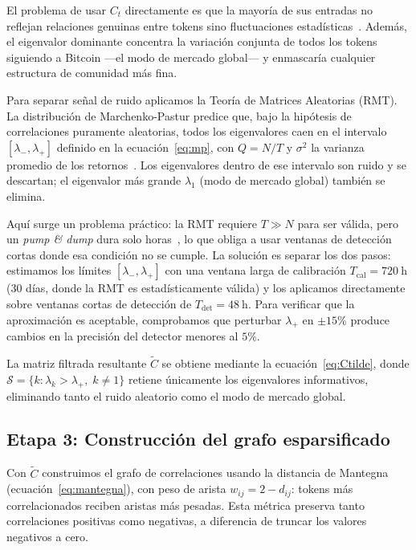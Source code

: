 El problema de usar $C_t$ directamente es que la mayoría de sus entradas
no reflejan relaciones genuinas entre tokens sino fluctuaciones
estadísticas~\cite{plerou1999}. Además, el eigenvalor dominante
concentra la variación conjunta de todos los tokens siguiendo a
Bitcoin ---el modo de mercado global--- y enmascaría cualquier
estructura de comunidad más fina.

Para separar señal de ruido aplicamos la Teoría de Matrices Aleatorias
(RMT). La distribución de Marchenko-Pastur predice que, bajo la hipótesis
de correlaciones puramente aleatorias, todos los eigenvalores caen en el
intervalo $[\lambda_-, \lambda_+]$ definido en la ecuación~\eqref{eq:mp},
con $Q = N/T$ y $\sigma^2$ la varianza promedio de los
retornos~\cite{plerou1999}. Los eigenvalores dentro de ese intervalo son
ruido y se descartan; el eigenvalor más grande $\lambda_1$ (modo de
mercado global) también se elimina.

Aquí surge un problema práctico: la RMT requiere $T \gg N$ para ser
válida, pero un \emph{pump \& dump} dura solo horas~\cite{lamorgia2020},
lo que obliga a usar ventanas de detección cortas donde esa condición
no se cumple. La solución es separar los dos pasos: estimamos los
límites $[\lambda_-, \lambda_+]$ con una ventana larga de calibración
$T_{\text{cal}} = 720~\text{h}$ (30 días, donde la RMT es
estadísticamente válida) y los aplicamos directamente sobre ventanas
cortas de detección de $T_{\text{det}} = 48~\text{h}$. Para verificar
que la aproximación es aceptable, comprobamos que perturbar $\lambda_+$
en ${\pm}15\%$ produce cambios en la precisión del detector menores
al $5\%$.

La matriz filtrada resultante $\tilde{C}$ se obtiene mediante la
ecuación~\eqref{eq:Ctilde}, donde $\mathcal{S} = \{k : \lambda_k >
\lambda_+,\; k \neq 1\}$ retiene únicamente los eigenvalores
informativos, eliminando tanto el ruido aleatorio como el modo de
mercado global.

\subsection{Etapa 3: Construcción del grafo esparsificado}

Con $\tilde{C}$ construimos el grafo de correlaciones usando la distancia
de Mantegna~\cite{mantegna1999} (ecuación~\eqref{eq:mantegna}), con peso
de arista $w_{ij} = 2 - d_{ij}$: tokens más correlacionados reciben
aristas más pesadas. Esta métrica preserva tanto correlaciones positivas
como negativas, a diferencia de truncar los valores negativos a cero.

